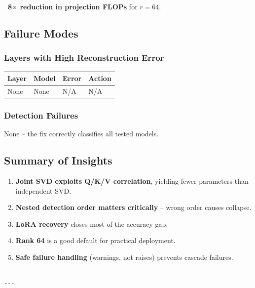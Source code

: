 \textbf{~8$\times$ reduction in projection FLOPs} for $r = 64$.

\subsection{Failure Modes}

\subsubsection{Layers with High Reconstruction Error}

\begin{table}[H]
\centering
\small
\begin{tabular}{llll}
\toprule
\textbf{Layer} & \textbf{Model} & \textbf{Error} & \textbf{Action} \\
\midrule
None & None & N/A & N/A \\
\bottomrule
\end{tabular}
\end{table}

\subsubsection{Detection Failures}

None -- the fix correctly classifies all tested models.

\subsection{Summary of Insights}

\begin{enumerate}
\item \textbf{Joint SVD exploits Q/K/V correlation}, yielding fewer parameters than
  independent SVD.
\item \textbf{Nested detection order matters critically} -- wrong order causes collapse.
\item \textbf{LoRA recovery} closes most of the accuracy gap.
\item \textbf{Rank 64} is a good default for practical deployment.
\item \textbf{Safe failure handling} (warnings, not raises) prevents cascade failures.
\end{enumerate}
\begin{lstlisting}

---
\end{lstlisting}